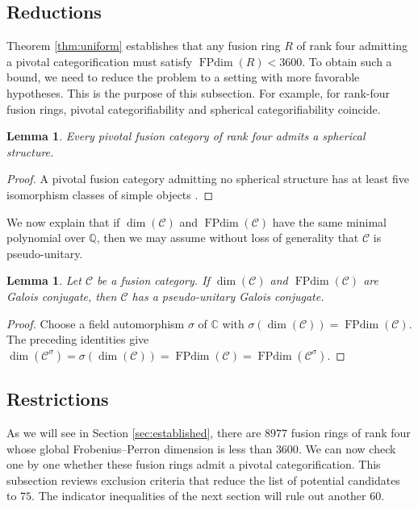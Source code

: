 \documentclass[11pt]{amsart}
\newtheorem{lemma}[theorem]{Lemma}
\theoremstyle{definition}
\DeclareMathOperator{\FPdim}{FPdim}
\newcommand{\C}{\mathbb C}
\newcommand{\Q}{\mathbb Q}
\numberwithin{equation}{section}
\begin{document}
\subsection{Reductions} 
Theorem \ref{thm:uniform} establishes that any fusion ring $R$ of rank four admitting a pivotal categorification must satisfy $\FPdim(R) < 3600$.
To obtain such a bound, we need to reduce the problem to a setting with more favorable hypotheses. 
This is the purpose of this subsection. 
For example, for rank-four fusion rings, pivotal categorifiability and spherical categorifiability coincide.

\begin{lemma}\label{lem:spherical}
Every pivotal fusion category of rank four admits a spherical structure.
\end{lemma}
\begin{proof}
A pivotal fusion category admitting no spherical structure has at
least five isomorphism classes of simple objects \cite[\S7, Lemma~4]{HaggeHong}.
\end{proof}

We now explain that if $\dim(\mathcal{C})$ and $\FPdim(\mathcal{C})$ have the same minimal polynomial over $\Q$, then we may assume without loss of generality that $\mathcal{C}$ is pseudo-unitary. 

\begin{lemma}\label{lem:galois-reduction}
Let $\mathcal C$ be a fusion category.
If $\dim(\mathcal C)$ and $\FPdim(\mathcal C)$ are Galois conjugate,
then $\mathcal C$ has a pseudo-unitary Galois conjugate.
\end{lemma}
\begin{proof}
Choose a field automorphism $\sigma$ of $\C$ with $\sigma(\dim(\mathcal C))=\FPdim(\mathcal C)$.
The preceding identities give
$\dim(\mathcal C^\sigma)=\sigma(\dim(\mathcal C))=\FPdim(\mathcal C)=\FPdim(\mathcal C^\sigma)$.
\end{proof}

\subsection{Restrictions} \label{sub-sec2.4}
As we will see in Section \ref{sec:established}, there are $8977$ fusion rings of rank four whose global Frobenius--Perron dimension is less than $3600$. 
We can now check one by one whether these fusion rings admit a pivotal categorification. 
This subsection reviews exclusion criteria that reduce the list of potential candidates to $75$.
The indicator inequalities of the next section will rule out another $60$.
\end{document}

